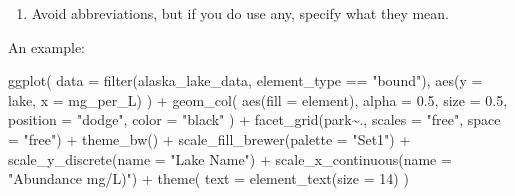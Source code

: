 \documentclass[
]{krantz}
\newenvironment{Shaded}{\begin{snugshade}}{\end{snugshade}}
\newcommand{\AttributeTok}[1]{\textcolor[rgb]{0.77,0.63,0.00}{#1}}
\newcommand{\DecValTok}[1]{\textcolor[rgb]{0.00,0.00,0.81}{#1}}
\newcommand{\FloatTok}[1]{\textcolor[rgb]{0.00,0.00,0.81}{#1}}
\newcommand{\FunctionTok}[1]{\textcolor[rgb]{0.00,0.00,0.00}{#1}}
\newcommand{\NormalTok}[1]{#1}
\newcommand{\SpecialCharTok}[1]{\textcolor[rgb]{0.00,0.00,0.00}{#1}}
\newcommand{\StringTok}[1]{\textcolor[rgb]{0.31,0.60,0.02}{#1}}
\providecommand{\tightlist}{%
  \setlength{\itemsep}{0pt}\setlength{\parskip}{0pt}}
\begin{document}
\begin{enumerate}
\def\labelenumi{\arabic{enumi}.}
\setcounter{enumi}{2}
\tightlist
\item
  Avoid abbreviations, but if you do use any, specify what they mean.
\end{enumerate}

An example:

\begin{Shaded}
\begin{Highlighting}[]
\FunctionTok{ggplot}\NormalTok{(}
  \AttributeTok{data =} \FunctionTok{filter}\NormalTok{(alaska\_lake\_data, element\_type }\SpecialCharTok{==} \StringTok{"bound"}\NormalTok{),}
  \FunctionTok{aes}\NormalTok{(}\AttributeTok{y =}\NormalTok{ lake, }\AttributeTok{x =}\NormalTok{ mg\_per\_L)}
\NormalTok{) }\SpecialCharTok{+}
  \FunctionTok{geom\_col}\NormalTok{(}
    \FunctionTok{aes}\NormalTok{(}\AttributeTok{fill =}\NormalTok{ element),}
    \AttributeTok{alpha =} \FloatTok{0.5}\NormalTok{, }\AttributeTok{size =} \FloatTok{0.5}\NormalTok{, }\AttributeTok{position =} \StringTok{"dodge"}\NormalTok{,}
    \AttributeTok{color =} \StringTok{"black"}
\NormalTok{  ) }\SpecialCharTok{+}
  \FunctionTok{facet\_grid}\NormalTok{(park}\SpecialCharTok{\textasciitilde{}}\NormalTok{., }\AttributeTok{scales =} \StringTok{"free"}\NormalTok{, }\AttributeTok{space =} \StringTok{"free"}\NormalTok{) }\SpecialCharTok{+}
  \FunctionTok{theme\_bw}\NormalTok{() }\SpecialCharTok{+}
  \FunctionTok{scale\_fill\_brewer}\NormalTok{(}\AttributeTok{palette =} \StringTok{"Set1"}\NormalTok{) }\SpecialCharTok{+}
  \FunctionTok{scale\_y\_discrete}\NormalTok{(}\AttributeTok{name =} \StringTok{"Lake Name"}\NormalTok{) }\SpecialCharTok{+}
  \FunctionTok{scale\_x\_continuous}\NormalTok{(}\AttributeTok{name =} \StringTok{"Abundance mg/L)"}\NormalTok{) }\SpecialCharTok{+}
  \FunctionTok{theme}\NormalTok{(}
    \AttributeTok{text =} \FunctionTok{element\_text}\NormalTok{(}\AttributeTok{size =} \DecValTok{14}\NormalTok{)}
\NormalTok{  )}
\end{Highlighting}
\end{Shaded}
\end{document}
